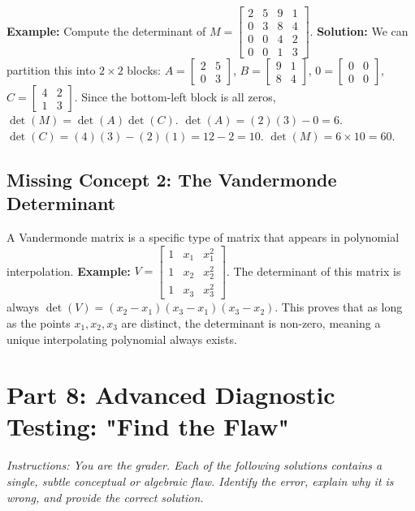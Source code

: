 \documentclass{article}
\begin{document}
\textbf{Example:} Compute the determinant of $M = \begin{bmatrix} 2 & 5 & 9 & 1 \\ 0 & 3 & 8 & 4 \\ 0 & 0 & 4 & 2 \\ 0 & 0 & 1 & 3 \end{bmatrix}$.
\textbf{Solution:} We can partition this into $2 \times 2$ blocks:
$A = \begin{bmatrix} 2 & 5 \\ 0 & 3 \end{bmatrix}$, $B = \begin{bmatrix} 9 & 1 \\ 8 & 4 \end{bmatrix}$, $0 = \begin{bmatrix} 0 & 0 \\ 0 & 0 \end{bmatrix}$, $C = \begin{bmatrix} 4 & 2 \\ 1 & 3 \end{bmatrix}$.
Since the bottom-left block is all zeros, $\det(M) = \det(A)\det(C)$.
$\det(A) = (2)(3) - 0 = 6$.
$\det(C) = (4)(3) - (2)(1) = 12 - 2 = 10$.
$\det(M) = 6 \times 10 = 60$.

\subsection{Missing Concept 2: The Vandermonde Determinant}
A Vandermonde matrix is a specific type of matrix that appears in polynomial interpolation.
\textbf{Example:} $V = \begin{bmatrix} 1 & x_1 & x_1^2 \\ 1 & x_2 & x_2^2 \\ 1 & x_3 & x_3^2 \end{bmatrix}$.
The determinant of this matrix is always $\det(V) = (x_2 - x_1)(x_3 - x_1)(x_3 - x_2)$. This proves that as long as the points $x_1, x_2, x_3$ are distinct, the determinant is non-zero, meaning a unique interpolating polynomial always exists.

\newpage
\section{Part 8: Advanced Diagnostic Testing: "Find the Flaw"}
\textit{Instructions: You are the grader. Each of the following solutions contains a single, subtle conceptual or algebraic flaw. Identify the error, explain why it is wrong, and provide the correct solution.}
\end{document}
